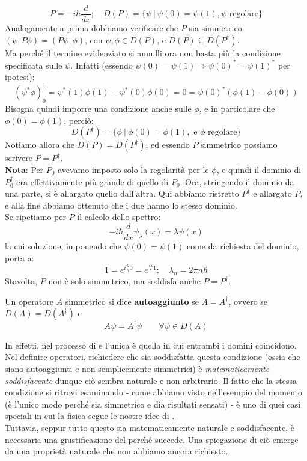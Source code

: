 \documentclass[../../FisicaTeorica.tex]{subfiles}
\begin{document}
\[
P=-i\hbar\frac{d}{dx}; \quad D(P) = \{\psi\>|\> \psi(0) = \psi(1), \psi \text{ regolare}\}
\] %
Analogamente a prima dobbiamo verificare che $P$ sia simmetrico $\left(\psi, P\phi\right)=(P\psi,\phi)$, con $\psi, \phi \in D(P)$, e $D(P)\subseteq D(P^\dag)$.\\
Ma perché il termine evidenziato si annulli ora non basta più la condizione specificata sulle $\psi$. Infatti (essendo $\psi(0) = \psi(1) \Rightarrow \psi(0)^* = \psi(1)^*$ per ipotesi):
\[
(\psi^* \phi)_0^1 = \psi^*(1)\phi(1) - \psi^*(0)\phi(0) = 0 = \psi(0)^*(\phi(1)-\phi(0))
\]
Bisogna quindi imporre una condizione anche sulle $\phi$, e in particolare che $\phi\left(0\right)= \phi\left(1\right)$, perciò:
\[
D(P^\dag) = \{ \phi \>|\> \phi(0) = \phi(1), \text{ e $\phi$ regolare}\}
\]
Notiamo allora che $D(P) = D(P^\dag)$, ed essendo $P$ simmetrico possiamo scrivere $P=P^\dag$.\\
\textbf{Nota}: Per $P_0$ avevamo imposto solo la regolarità per le $\phi$, e quindi il dominio di $P_0^\dag$ era effettivamente più grande di quello di $P_0$. Ora, stringendo il dominio da una parte, si è allargato quello dall'altra. Qui abbiamo ristretto $P^\dag$ e allargato $P$, e alla fine abbiamo ottenuto che i due hanno lo stesso dominio.\\
Se ripetiamo per $P$ il calcolo dello spettro:
\[
-i\hbar\frac{d}{dx}\psi_\lambda\left(x\right)=\lambda\psi\left(x\right)
\]
la cui soluzione, imponendo che $\psi\left(0\right)=\psi\left(1\right)$ come da richiesta del dominio, porta a:
\[
1=e^{i\frac{\lambda}{\hbar}0}=e^{\frac{i\lambda}{\hbar}1};\quad \lambda_n=2\pi n\hbar
\]
Stavolta, $P$ non è solo simmetrico, ma soddisfa anche $P=P^\dag$.

\begin{dfn}
Un operatore $A$ simmetrico si dice \textbf{autoaggiunto} se $A=A^\dag$, ovvero se $D\left(A\right)=D\left(A^\dag\right)$ e 
\[
A\psi=A^\dag\psi \qquad \forall\psi\in D(A)
\]
\end{dfn}
In effetti, nel processo di  e  l'unica  è quella in cui entrambi i domini coincidono. Nel definire operatori, richiedere che sia soddisfatta questa condizione (ossia che siano autoaggiunti e non semplicemente simmetrici) è \textit{matematicamente soddisfacente} dunque ciò sembra naturale e non arbitrario.
Il fatto che la stessa condizione si ritrovi esaminando  - come abbiamo visto nell'esempio del momento (è l'unico modo perché sia simmetrico e dia risultati sensati) - è uno di quei casi speciali in cui la fisica segue le nostre idee di .\\
Tuttavia, seppur tutto questo sia matematicamente naturale e soddisfacente, è necessaria una giustificazione  del perché succede. Una spiegazione di ciò emerge da una proprietà naturale che non abbiamo ancora richiesto.\\
\end{document}
